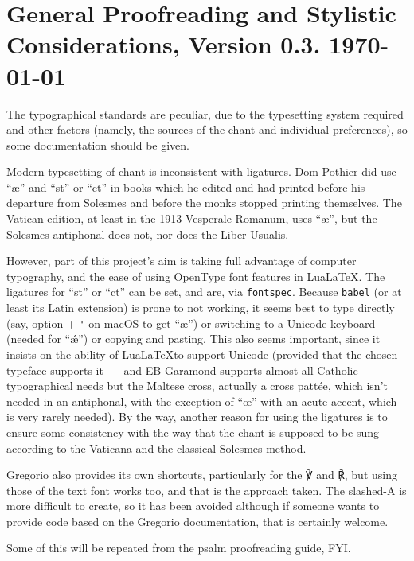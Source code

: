 \documentclass[11pt]{article}
\begin{document}
\section{General Proofreading and Stylistic Considerations, Version 0.3. \today}

The typographical standards are peculiar, due to the typesetting system required and other factors (namely, the sources of the chant and individual preferences), so some documentation should be given.

Modern typesetting of chant is inconsistent with ligatures. Dom Pothier did use ``æ'' and ``st'' or ``ct'' in books which he edited and had printed before his departure from Solesmes and before the monks stopped printing themselves. The Vatican edition, at least in the 1913 Vesperale Romanum, uses ``æ'', but the Solesmes antiphonal does not, nor does the Liber Usualis.

However, part of this project's aim is taking full advantage of computer typography, and the ease of using OpenType font features in Lua\LaTeX. The ligatures for ``st'' or ``ct'' can be set, and are, via \verb|fontspec|. Because \verb|babel| (or at least its Latin extension) is prone to not working, it seems best to type directly (say, option + \verb|'| on macOS to get ``æ'') or switching to a Unicode keyboard (needed for ``ǽ'') or copying and pasting. This also seems important, since it insists on the ability of Lua\LaTeX to support Unicode (provided that the chosen typeface supports it — and EB Garamond supports almost all Catholic typographical needs but the Maltese cross, actually a cross pattée, which isn't needed in an antiphonal, with the exception of ``œ'' with an acute accent, which is very rarely needed). By the way, another reason for using the ligatures is to ensure some consistency with the way that the chant is supposed to be sung according to the Vaticana and the classical Solesmes method.

Gregorio also provides its own shortcuts, particularly for the ℣ and ℟, but using those of the text font works too, and that is the approach taken. The slashed-A is more difficult to create, so it has been avoided although if someone wants to provide code based on the Gregorio documentation, that is certainly welcome.

Some of this will be repeated from the psalm proofreading guide, FYI. 
\end{document}
